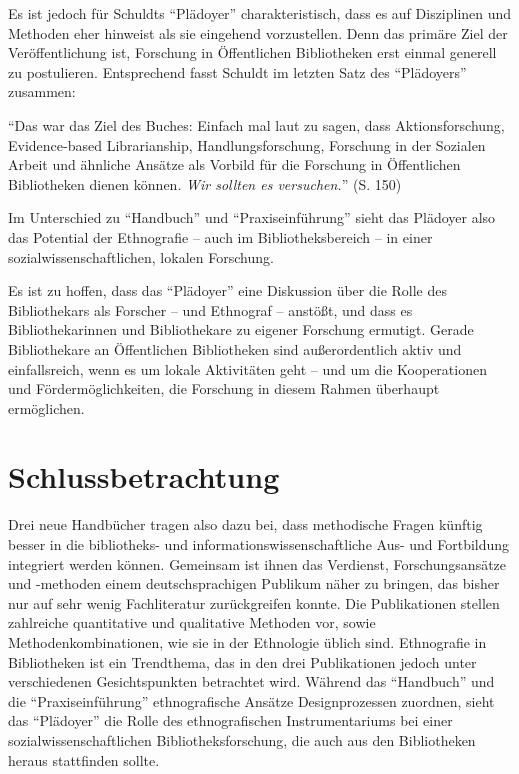 \documentclass[a4paper,
fontsize=11pt,
oneside,
numbers=noperiodatend,
parskip=half-,
bibliography=totoc,
final
]{scrartcl}
\begin{document}
Es ist jedoch für Schuldts \enquote{Plädoyer} charakteristisch, dass es
auf Disziplinen und Methoden eher hinweist als sie eingehend
vorzustellen. Denn das primäre Ziel der Veröffentlichung ist, Forschung
in Öffentlichen Bibliotheken erst einmal generell zu postulieren.
Entsprechend fasst Schuldt im letzten Satz des \enquote{Plädoyers}
zusammen:

\enquote{Das war das Ziel des Buches: Einfach mal laut zu sagen, dass
Aktionsforschung, Evidence-based Librarianship, Handlungsforschung,
Forschung in der Sozialen Arbeit und ähnliche Ansätze als Vorbild für
die Forschung in Öffentlichen Bibliotheken dienen können. \emph{Wir
sollten es versuchen.}} (S. 150)

Im Unterschied zu \enquote{Handbuch} und \enquote{Praxiseinführung}
sieht das Plädoyer also das Potential der Ethnografie -- auch im
Bibliotheksbereich -- in einer sozialwissenschaftlichen, lokalen
Forschung.

Es ist zu hoffen, dass das \enquote{Plädoyer} eine Diskussion über die
Rolle des Bibliothekars als Forscher -- und Ethnograf -- anstößt, und
dass es Bibliothekarinnen und Bibliothekare zu eigener Forschung
ermutigt. Gerade Bibliothekare an Öffentlichen Bibliotheken sind
außerordentlich aktiv und einfallsreich, wenn es um lokale Aktivitäten
geht -- und um die Kooperationen und Fördermöglichkeiten, die Forschung
in diesem Rahmen überhaupt ermöglichen.

\section*{Schlussbetrachtung}\label{schlussbetrachtung}

Drei neue Handbücher tragen also dazu bei, dass methodische Fragen
künftig besser in die bibliotheks- und informationswissenschaftliche
Aus- und Fortbildung integriert werden können. Gemeinsam ist ihnen das
Verdienst, Forschungsansätze und -methoden einem deutschsprachigen
Publikum näher zu bringen, das bisher nur auf sehr wenig Fachliteratur
zurückgreifen konnte. Die Publikationen stellen zahlreiche quantitative
und qualitative Methoden vor, sowie Methodenkombinationen, wie sie in
der Ethnologie üblich sind. Ethnografie in Bibliotheken ist ein
Trendthema, das in den drei Publikationen jedoch unter verschiedenen
Gesichtspunkten betrachtet wird. Während das \enquote{Handbuch} und die
\enquote{Praxiseinführung} ethnografische Ansätze Designprozessen
zuordnen, sieht das \enquote{Plädoyer} die Rolle des ethnografischen
Instrumentariums bei einer sozialwissenschaftlichen
Bibliotheksforschung, die auch aus den Bibliotheken heraus stattfinden
sollte.
\end{document}
